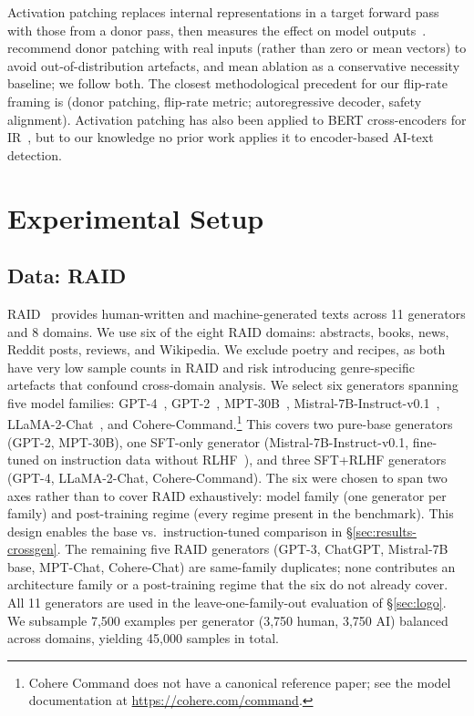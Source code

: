 \documentclass[11pt]{article}
\begin{document}
Activation patching replaces internal representations in a target forward pass with those from a donor pass, then measures the effect on model outputs~\citep{vig2020causal,meng2022rome}. \citet{heimersheim2024patching} recommend donor patching with real inputs (rather than zero or mean vectors) to avoid out-of-distribution artefacts, and mean ablation as a conservative necessity baseline; we follow both. The closest methodological precedent for our flip-rate framing is \citet{ravindran2025adversarial} (donor patching, flip-rate metric; autoregressive decoder, safety alignment). Activation patching has also been applied to BERT cross-encoders for IR~\citep{lu2025pathway}, but to our knowledge no prior work applies it to encoder-based AI-text detection.

\section{Experimental Setup}
\label{sec:setup}

\subsection{Data: RAID}
\label{sec:setup-data}

RAID~\citep{dugan2024raid} provides human-written and machine-generated texts across 11 generators and 8 domains. We use six of the eight RAID domains: abstracts, books, news, Reddit posts, reviews, and Wikipedia. We exclude poetry and recipes, as both have very low sample counts in RAID and risk introducing genre-specific artefacts that confound cross-domain analysis. We select six generators spanning five model families: GPT-4~\citep{openai2023gpt4}, GPT-2~\citep{radford2019gpt2}, MPT-30B~\citep{mosaicml2023mpt}, Mistral-7B-Instruct-v0.1~\citep{jiang2023mistral}, LLaMA-2-Chat~\citep{touvron2023llama2}, and Cohere-Command.\footnote{Cohere Command does not have a canonical reference paper; see the model documentation at \url{https://cohere.com/command}.} This covers two pure-base generators (GPT-2, MPT-30B), one SFT-only generator (Mistral-7B-Instruct-v0.1, fine-tuned on instruction data without RLHF~\citep{jiang2023mistral}), and three SFT+RLHF generators (GPT-4, LLaMA-2-Chat, Cohere-Command). The six were chosen to span two axes rather than to cover RAID exhaustively: model family (one generator per family) and post-training regime (every regime present in the benchmark). This design enables the base vs.\ instruction-tuned comparison in §\ref{sec:results-crossgen}. The remaining five RAID generators (GPT-3, ChatGPT, Mistral-7B base, MPT-Chat, Cohere-Chat) are same-family duplicates; none contributes an architecture family or a post-training regime that the six do not already cover. All 11 generators are used in the leave-one-family-out evaluation of §\ref{sec:logo}. We subsample 7{,}500 examples per generator (3{,}750 human, 3{,}750 AI) balanced across domains, yielding 45{,}000 samples in total.
\end{document}
